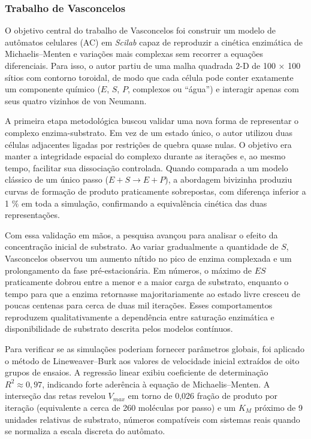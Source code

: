 \documentclass[12pt,oneside]{report}
\begin{document}
\subsubsection{Trabalho de Vasconcelos \citeyear{vasconcelos2019}}

O objetivo central do trabalho de Vasconcelos \cite{vasconcelos2019} foi construir um modelo de autômatos celulares (AC) em \textit{Scilab} capaz de reproduzir a cinética enzimática de Michaelis–Menten e variações mais complexas sem recorrer a equações diferenciais. Para isso, o autor partiu de uma malha quadrada 2-D de 100 × 100 sítios com contorno toroidal, de modo que cada célula pode conter exatamente um componente químico ($E$, $S$, $P$, complexos ou “água”) e interagir apenas com seus quatro vizinhos de von Neumann.

A primeira etapa metodológica buscou validar uma nova forma de representar o complexo enzima-substrato. Em vez de um estado único, o autor utilizou duas células adjacentes ligadas por restrições de quebra quase nulas. O objetivo era manter a integridade espacial do complexo durante as iterações e, ao mesmo tempo, facilitar sua dissociação controlada. Quando comparada a um modelo clássico de um único passo ($E + S \rightarrow E + P$), a abordagem bivizinha produziu curvas de formação de produto praticamente sobrepostas, com diferença inferior a 1 $\%$ em toda a simulação, confirmando a equivalência cinética das duas representações.

Com essa validação em mãos, a pesquisa avançou para analisar o efeito da concentração inicial de substrato. Ao variar gradualmente a quantidade de $S$, Vasconcelos observou um aumento nítido no pico de enzima complexada e um prolongamento da fase pré-estacionária. Em números, o máximo de $ES$ praticamente dobrou entre a menor e a maior carga de substrato, enquanto o tempo para que a enzima retornasse majoritariamente ao estado livre cresceu de poucas centenas para cerca de duas mil iterações. Esses comportamentos reproduzem qualitativamente a dependência entre saturação enzimática e disponibilidade de substrato descrita pelos modelos contínuos.

Para verificar se as simulações poderiam fornecer parâmetros globais, foi aplicado o método de Lineweaver–Burk aos valores de velocidade inicial extraídos de oito grupos de ensaios. A regressão linear exibiu coeficiente de determinação $R^2 \approx 0,97$, indicando forte aderência à equação de Michaelis–Menten. A interseção das retas revelou $V_{max}$ em torno de 0,026 fração de produto por iteração (equivalente a cerca de 260 moléculas por passo) e um $K_M$ próximo de 9 unidades relativas de substrato, números compatíveis com sistemas reais quando se normaliza a escala discreta do autômato.
\end{document}
